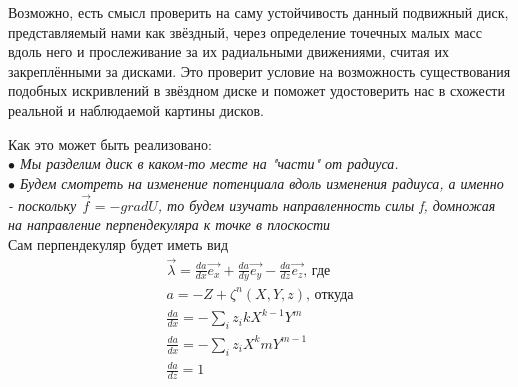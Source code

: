 \documentclass[a4paper,12pt]{article}
\begin{document}
Возможно, есть смысл проверить на саму устойчивость данный подвижный диск, представляемый нами как звёздный, через определение точечных малых масс вдоль него и прослеживание за их радиальными движениями, считая их закреплёнными за дисками. Это проверит условие на возможность существования подобных искривлений в звёздном диске и поможет удостоверить нас в схожести реальной и наблюдаемой картины дисков.

Как это может быть реализовано: \\
\textit{$\bullet$ Мы разделим диск в каком-то месте на "части" от радиуса.} \\
\textit{$\bullet$ Будем смотреть на изменение потенциала вдоль изменения радиуса, а именно - поскольку $\vec{f} = -grad U$, то будем изучать направленность силы f, домножая на направление перпендекуляра к точке в плоскости} \\
Сам перпендекуляр будет иметь вид 
\begin{gather}
	\vec{\lambda} = \frac{da}{dx}\vec{e_x}+\frac{da}{dy}\vec{e_y}-\frac{da}{dz}\vec{e_z} \text{, где} \\
	a = -Z + \zeta^n(X, Y, z) \textit{, откуда} \\
	\frac{da}{dx} =  -\sum_i z_i kX^{k-1} Y^m \\
	\frac{da}{dx} =  -\sum_i z_i X^{k} mY^{m-1} \\
	\frac{da}{dz} = 1
\end{gather}
\end{document}
